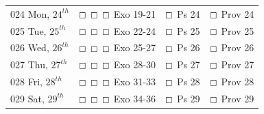 \documentclass[10pt,landscape,twocolumn,letterpaper]{article}
\begin{document}
\begin{tabular}{p{0.8in}p{1.3in}p{1.2in}p{1.2in}}
\tiny 024 \normalsize Mon, $24^{th}$ & $\boxempty$ $\boxempty$ $\boxempty$ \hspace{.05in} \textcolor[rgb]{1.00,0.00,0.00}{Exo 19-21} & $\boxempty$ \hspace{.05in} \textcolor[rgb]{0.00,1.00,0.00}{Ps 24} & $\boxempty$ \hspace{.05in} \textcolor[rgb]{0.00,0.00,1.00}{Prov 24}  \\

\tiny 025 \normalsize Tue, $25^{th}$ &  $\boxempty$ $\boxempty$ $\boxempty$ \hspace{.05in} \textcolor[rgb]{1.00,0.00,0.00}{Exo 22-24} &  $\boxempty$ \hspace{.05in} \textcolor[rgb]{0.00,1.00,0.00}{Ps 25} &  $\boxempty$ \hspace{.05in} \textcolor[rgb]{0.00,0.00,1.00}{Prov 25}  \\

\tiny 026 \normalsize Wed, $26^{th}$ &  $\boxempty$ $\boxempty$ $\boxempty$ \hspace{.05in} \textcolor[rgb]{1.00,0.00,0.00}{Exo 25-27} &  $\boxempty$ \hspace{.05in} \textcolor[rgb]{0.00,1.00,0.00}{Ps 26} &  $\boxempty$ \hspace{.05in} \textcolor[rgb]{0.00,0.00,1.00}{Prov 26}  \\

\tiny 027 \normalsize Thu, $27^{th}$ &  $\boxempty$ $\boxempty$ $\boxempty$ \hspace{.05in} \textcolor[rgb]{1.00,0.00,0.00}{Exo 28-30} &  $\boxempty$ \hspace{.05in} \textcolor[rgb]{0.00,1.00,0.00}{Ps 27} &  $\boxempty$ \hspace{.05in} \textcolor[rgb]{0.00,0.00,1.00}{Prov 27}  \\

\tiny 028 \normalsize Fri, $28^{th}$ &   $\boxempty$ $\boxempty$ $\boxempty$ \hspace{.05in} \textcolor[rgb]{1.00,0.00,0.00}{Exo 31-33} & $\boxempty$ \hspace{.05in} \textcolor[rgb]{0.00,1.00,0.00}{Ps 28} & $\boxempty$ \hspace{.05in} \textcolor[rgb]{0.00,0.00,1.00}{Prov 28}  \\

\tiny 029 \normalsize Sat, $29^{th}$ &   $\boxempty$ $\boxempty$ $\boxempty$ \hspace{.05in} \textcolor[rgb]{1.00,0.00,0.00}{Exo 34-36} & $\boxempty$ \hspace{.05in} \textcolor[rgb]{0.00,1.00,0.00}{Ps 29} & $\boxempty$ \hspace{.05in} \textcolor[rgb]{0.00,0.00,1.00}{Prov 29}  \\


\end{tabular}
\end{document}
